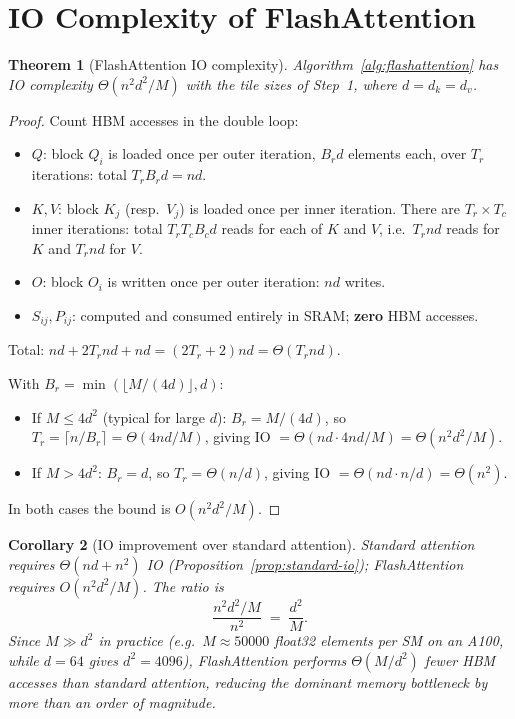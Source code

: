 \documentclass[11pt]{amsart}
\theoremstyle{plain}
\newtheorem{theorem}{Theorem}[section]
\newtheorem{corollary}[theorem]{Corollary}
\theoremstyle{definition}
\begin{document}
\section{IO Complexity of FlashAttention}
\label{sec:flashattention-io}

\begin{theorem}[FlashAttention IO complexity]
\label{thm:flashattention-io}
Algorithm~\ref{alg:flashattention} has IO complexity $\Theta(n^2 d^2 / M)$
with the tile sizes of Step~1, where $d = d_k = d_v$.
\end{theorem}
\begin{proof}
Count HBM accesses in the double loop:
\begin{itemize}
    \item $Q$: block $Q_i$ is loaded once per outer iteration,
    $B_r d$ elements each, over $T_r$ iterations: total $T_r B_r d = nd$.
    \item $K, V$: block $K_j$ (resp.\ $V_j$) is loaded once per inner
    iteration.  There are $T_r \times T_c$ inner iterations:
    total $T_r T_c B_c d$ reads for each of $K$ and $V$, i.e.\ $T_r nd$
    reads for $K$ and $T_r nd$ for $V$.
    \item $O$: block $O_i$ is written once per outer iteration: $nd$ writes.
    \item $S_{ij}, P_{ij}$: computed and consumed entirely in SRAM;
    \textbf{zero} HBM accesses.
\end{itemize}
Total: $nd + 2T_r nd + nd = (2T_r + 2)nd = \Theta(T_r nd)$.

With $B_r = \min(\lfloor M/(4d)\rfloor, d)$:
\begin{itemize}
    \item If $M \leq 4d^2$ (typical for large $d$): $B_r = M/(4d)$,
    so $T_r = \lceil n/B_r \rceil = \Theta(4nd/M)$, giving
    IO $= \Theta(nd \cdot 4nd/M) = \Theta(n^2 d^2 / M)$.
    \item If $M > 4d^2$: $B_r = d$, so $T_r = \Theta(n/d)$, giving
    IO $= \Theta(nd \cdot n/d) = \Theta(n^2)$.
\end{itemize}
In both cases the bound is $O(n^2 d^2 / M)$.
\end{proof}

\begin{corollary}[IO improvement over standard attention]
\label{cor:io-improvement}
Standard attention requires $\Theta(nd + n^2)$ IO
(Proposition~\ref{prop:standard-io}); FlashAttention requires
$O(n^2 d^2/M)$.  The ratio is
\[
    \frac{n^2 d^2/M}{n^2}
    \;=\;
    \frac{d^2}{M}.
\]
Since $M \gg d^2$ in practice (e.g.\ $M \approx 50000$ float32 elements
per SM on an A100, while $d = 64$ gives $d^2 = 4096$), FlashAttention
performs $\Theta(M/d^2)$ fewer HBM accesses than standard attention,
reducing the dominant memory bottleneck by more than an order of magnitude.
\end{corollary}
\end{document}
